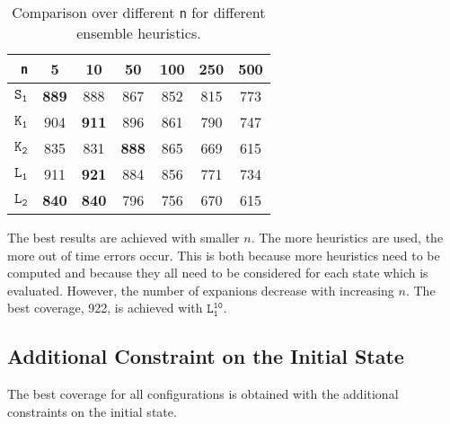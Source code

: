 \begin{table}[h!]
    \begin{center}
        \begin{tabular}{|r|c|c|c|c|c|c|}
            \hline
            \textbf{\texttt{n}} & \textbf{5} & \textbf{10} & \textbf{50} & \textbf{100} & \textbf{250} & \textbf{500} \\
            \hline \hline
            \textbf{$\texttt{S}_\texttt{1}$} & \textbf{889} & 888 & 867 & 852 & 815 & 773 \\ \hline
            \textbf{$\texttt{K}_\texttt{1}$} & 904 & \textbf{911} & 896 & 861 & 790 & 747 \\ \hline
            \textbf{$\texttt{K}_\texttt{2}$} & 835 & 831 & \textbf{888} & 865 & 669 & 615 \\ \hline
            \textbf{$\texttt{L}_\texttt{1}$} & 911 & \textbf{921} & 884 & 856 & 771 & 734 \\ \hline
            \textbf{$\texttt{L}_\texttt{2}$} & \textbf{840} & \textbf{840} & 796 & 756 & 670 & 615 \\ \hline
        \end{tabular}
        \caption{Comparison over different \texttt{n} for different ensemble heuristics.}
        \label{table:ensemble-n}
    \end{center}
\end{table}

The best results are achieved with smaller $n$.
The more heuristics are used, the more out of time errors occur.
This is both because more heuristics need to be computed and because they all need to be considered for each state which is evaluated.
However, the number of expanions decrease with increasing $n$.
The best coverage, 922, is achieved with $\texttt{L}_\texttt{1}^\texttt{10}$.

\subsection{Additional Constraint on the Initial State}\label{subsec:additional-constraint-on-the-initial-state}
The best coverage for all configurations is obtained with the additional constraints on the initial state.

